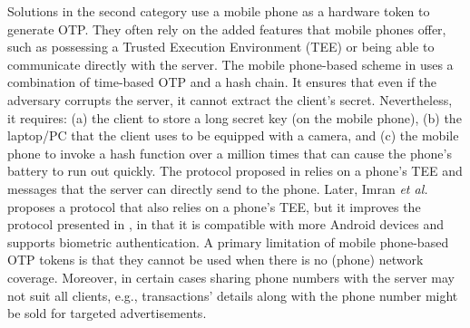 Solutions in the second category use a mobile phone as a hardware token to generate OTP. They often rely on the added features that mobile phones offer, such as possessing a Trusted Execution Environment (TEE) or being able to communicate directly with the server. The mobile phone-based scheme in  \cite{KoganMB17} uses a combination of time-based OTP and a hash chain. It ensures that even if the adversary corrupts the server, it cannot extract the client's secret. Nevertheless, it requires: (a) the client to store a long secret key (on the mobile phone), (b)  the laptop/PC that the client uses to be equipped with a camera, and (c)  the mobile phone to invoke a hash function over a million times that can cause the phone's battery to run out quickly. The protocol proposed in \cite{KonothFFARB20} relies on a phone's TEE  and messages that the server can directly send to the phone. Later,  Imran \textit{et al.} \cite{SARA22} proposes a protocol that also relies on a phone's TEE, but it improves the protocol presented in \cite{KonothFFARB20}, in that it is compatible with more Android devices and supports biometric authentication.  A primary limitation of mobile phone-based OTP tokens is that they cannot be used when there is no (phone) network coverage. Moreover, in certain cases sharing phone numbers with the server may not suit all clients, e.g., transactions' details along with the phone number might be sold for targeted advertisements. 
%





%







